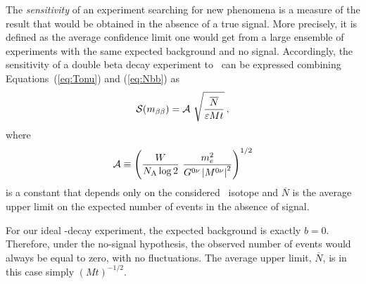 \documentclass{PoS}
\begin{document}
The \emph{sensitivity} of an experiment searching for new phenomena is a measure of the result that would be obtained in the absence of a true signal. More precisely, it is defined as the average confidence limit one would get from a large ensemble of experiments with the same expected background and no signal. Accordingly, the sensitivity of a double beta decay experiment to \mbb\ can be expressed combining Equations~(\ref{eq:Tonu}) and (\ref{eq:Nbb}) as
\begin{equation}
\mathcal{S}(\mbb) = \mathcal{A}\ \sqrt{\frac{\overline{N}}{\varepsilon Mt}}\,, \label{eq:Sensitivity1}
\end{equation}
where
\begin{equation}
\mathcal{A} \equiv \left(\frac{W}{N_\mathrm{A}\log2}\ \frac{m_{e}^{2}}{G^{0\nu}\left|M^{0\nu}\right|^{2}} \right)^{1/2}
\end{equation}
is a constant that depends only on the considered \bb\ isotope and $\overline{N}$ is the average upper limit on the expected number of events in the absence of signal.

For our ideal \bbonu-decay experiment, the expected background is exactly $b=0$. Therefore, under the no-signal hypothesis, the observed number of events would always be equal to zero, with no fluctuations. The average upper limit, $\overline{N}$, is in this case simply $(Mt)^{-1/2}$.
\end{document}
